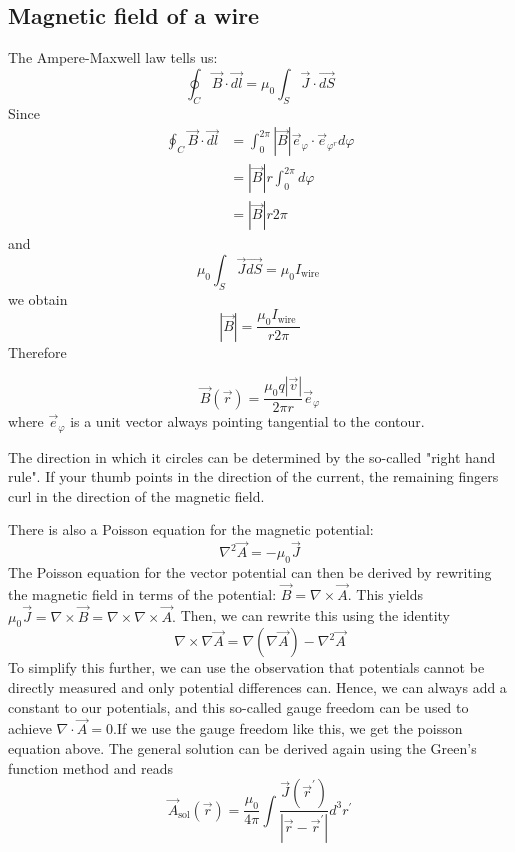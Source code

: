 \subsection{Magnetic field of a wire}
The Ampere-Maxwell law tells us:
\begin{equation}
\oint_{C} \vec{B} \cdot \overrightarrow{d l}=\mu_{0} \int_{S} \vec{J} \cdot \overrightarrow{d S}
\end{equation}
Since
$$
\begin{aligned}
\oint_{C} \vec{B} \cdot \overrightarrow{d l} &=\int_{0}^{2 \pi}|\vec{B}| \vec{e}_{\varphi} \cdot \vec{e}_{\varphi^{r}} d \varphi \\
&=|\vec{B}| r \int_{0}^{2 \pi} d \varphi \\
&=|\vec{B}| r 2 \pi
\end{aligned}
$$
and
$$
\mu_{0} \int_{S} \vec{J} \overrightarrow{d S}=\mu_{0} I_{\text {wire }}
$$
we obtain
$$
|\vec{B}|=\frac{\mu_{0} I_{\text {wire }}}{r 2 \pi}
$$
Therefore
\begin{qt}
\begin{equation}
\vec{B}(\vec{r})=\frac{\mu_{0} q|\vec{v}|}{2 \pi r} \vec{e}_{\varphi}
\end{equation}
where $\vec{e}_{\varphi}$ is a unit vector always pointing tangential to the contour.
\end{qt}
The direction in which it circles can be determined by the so-called "right hand rule". If your thumb points in the direction of the current, the remaining fingers curl in the direction of the magnetic field.

There is also a Poisson equation for the magnetic potential:
\begin{equation}
\nabla^{2} \vec{A}=-\mu_{0} \vec{J}
\end{equation}
The Poisson equation for the vector potential can then be derived by rewriting the magnetic field in terms of the potential: $\vec{B}=\nabla \times \vec{A}$. This yields $\mu_{0} \vec{J}=\nabla \times \vec{B}=\nabla \times \nabla \times \vec{A} .$ Then, we can rewrite this using the identity
$$
\nabla \times \nabla \vec{A}=\nabla(\nabla \vec{A})-\nabla^{2} \vec{A}
$$
To simplify this further, we can use the observation that potentials cannot be directly measured and only potential differences can. Hence, we can always add a constant to our potentials, and this so-called gauge freedom can be used to achieve \textbf{$\nabla\cdot\vec{A}=0$}.If we use the gauge freedom like this, we get the poisson equation above. The general solution can be derived again using the Green’s function method and reads
\begin{equation}
\vec{A}_{\mathrm{sol}}(\vec{r})=\frac{\mu_{0}}{4 \pi} \int \frac{\vec{J}\left(\vec{r}^{\prime}\right)}{\left|\vec{r}-\vec{r}^{\prime}\right|} d^{3} r^{\prime}
\end{equation}

